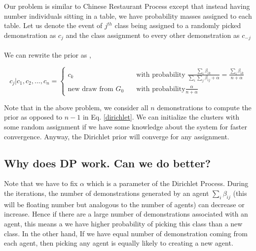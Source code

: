 \documentclass{article}[11pt]
\begin{document}
%
%

Our problem is similar to Chinese Restaurant Process except that instead having number individuals sitting in a table, we have probability masses assigned to each table. Let us denote the event of $j^{th}$ class being assigned to a randomly picked demonstration as $c_j$ and the class assignment to every other demonstration as $c_{-j}$\\ \\
We can rewrite the prior as ,

\[   
c_j | c_1, c_2 ,..., c_n = 
     \begin{cases}
       c_k  &\quad\text{with probability } \frac{\sum_{i} \beta_{ik}}{\sum_{i}\sum_j \beta_{ij} +\alpha} = \frac{\sum_{i} \beta_{ik}}{n+\alpha} \\
       \text{new draw from }G_0 &\quad\text{with probability} \frac{\alpha}{n+\alpha}
     \end{cases}
\] 

Note that in the above problem, we consider all $n$ demonstrations to compute the prior as opposed to $n-1$ in Eq. \ref{dirichlet}. We can initialize the clusters with some random assignment if we have some knowledge about the system for faster convergence. Anyway, the Dirichlet prior will converge for any assignment. 

\subsection{Why does DP work. Can we do better?}
Note that we have to fix $\alpha$ which is a parameter of the Dirichlet Process. During the iterations, the number of demonstrations generated by an agent $\sum_{i} \beta_{ij}$ (this will be floating number but analogous to the number of agents) can decrease or increase. Hence if there are a large number of demonstrations associated with an agent, this means a we have higher probability of picking this class than a new class. In the other hand, If we have equal number of demonstration coming from each agent, then picking any agent is equally likely to creating a new agent.
\end{document}
